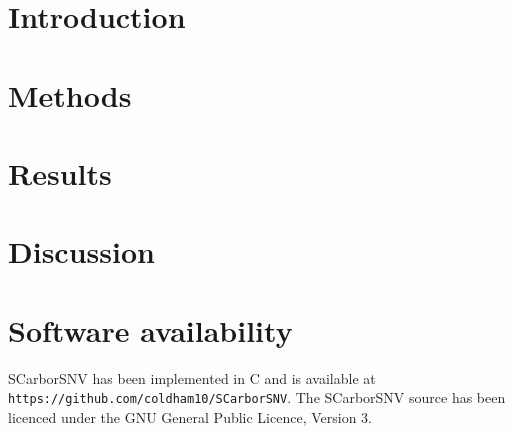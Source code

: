 \documentclass{article}
\begin{document}
\nocite{*}


\doublespacing


\section{Introduction}


\section{Methods}


\section{Results}


\section{Discussion}



\section{Software availability}
SCarborSNV has been implemented in C and is available at \texttt{https://github.com/coldham10/SCarborSNV}. 
The SCarborSNV source has been licenced under the GNU General Public Licence, Version 3.




\newpage



\newpage
\appendix

\end{document}

